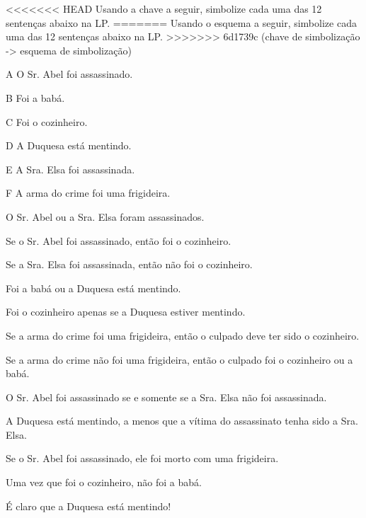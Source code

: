 <<<<<<< HEAD
\problempart Usando a chave a seguir, simbolize cada uma das 12 sentenças abaixo na LP.
=======
\problempart Usando o esquema a seguir, simbolize cada uma das 12 sentenças abaixo na LP.
>>>>>>> 6d1739c (chave de simbolização -> esquema de simbolização)
\begin{ekey}
	\item[A] O Sr. Abel foi assassinado.
	\item[B] Foi a babá.
	\item[C] Foi o cozinheiro.
	\item[D] A Duquesa está mentindo.
	\item[E] A Sra. Elsa foi assassinada.
	\item[F] A arma do crime foi uma frigideira.
\end{ekey}
\begin{earg}
	\item O Sr. Abel ou a Sra. Elsa foram assassinados.
	\item Se o Sr. Abel foi assassinado, então foi o cozinheiro.
	\item Se a Sra. Elsa foi assassinada, então não foi o cozinheiro.
	\item Foi a babá ou a Duquesa está mentindo.
	\item Foi o cozinheiro apenas se a Duquesa estiver mentindo.
	\item Se a arma do crime foi uma frigideira, então o culpado deve ter sido o cozinheiro.
	\item Se a arma do crime não foi uma frigideira, então o culpado foi o cozinheiro ou a babá.
	\item O Sr. Abel foi assassinado se e somente se a Sra. Elsa não foi assassinada.
	\item A Duquesa está mentindo, a menos que a vítima do assassinato tenha sido a Sra. Elsa.
	\item Se o Sr. Abel foi assassinado, ele foi morto com uma frigideira.
	\item Uma vez que foi o cozinheiro, não foi a babá.
	\item É claro que a Duquesa está mentindo!
\end{earg}
\solutions

